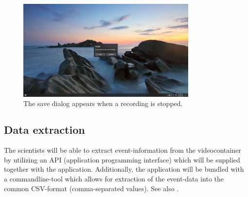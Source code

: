 \begin{figure}[H]
  \includegraphics[width=0.8\textwidth, trim={20cm 10cm 20cm 10cm}, clip]{resources/ui_save_dialogue.png}
  \centering
  \caption{The save dialog appears when a recording is stopped.}
  \label{fig:sm_ui_saving}
\end{figure}

\subsection{Data extraction}
\label{sec:sm_extraction}
The \glspl{scientist} will be able to extract \gls{event}-information from the videocontainer by utilizing an API (application programming interface) which will be supplied together with the application. Additionally, the application will be bundled with a commandline-tool which allows for extraction of the \gls{event}-data into the common CSV-format (comma-separated values). See also .